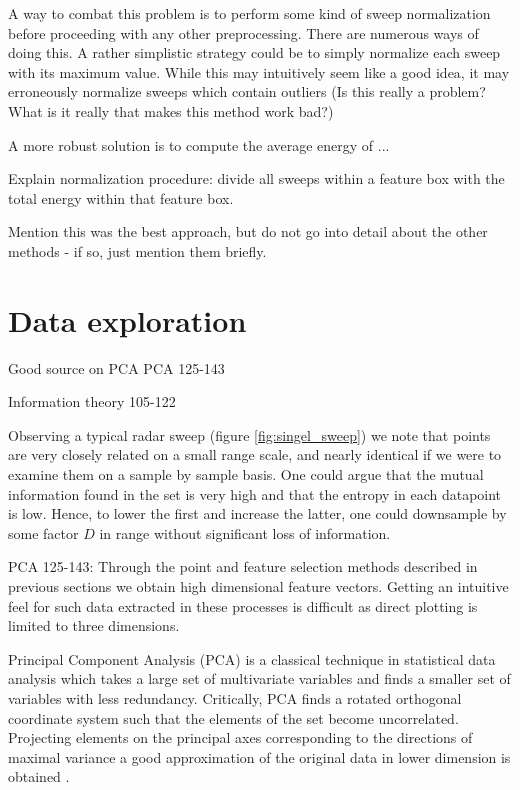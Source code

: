 A way to combat this problem is to perform some kind of sweep normalization before proceeding with any other preprocessing. There are numerous ways of doing this. A rather simplistic strategy could be to simply normalize each sweep with its maximum value. While this may intuitively seem like a good idea, it may erroneously normalize sweeps which contain outliers (Is this really a problem? What is it really that makes this method work bad?)

A more robust solution is to compute the average energy of ...

Explain normalization procedure: divide all sweeps within a feature box with the total energy within that feature box. 

Mention this was the best approach, but do not go into detail about the other methods - if so, just mention them briefly.
\section{Data exploration}


Good source on PCA
\cite{hyvasrinen_karhunen_oja_2004}
PCA 125-143

Information theory
105-122

Observing a typical radar sweep (figure \ref{fig:singel_sweep}) we note that points are very closely related on a small range scale, and nearly identical if we were to examine them on a sample by sample basis. One could argue that the mutual information found in the set is very high and that the entropy in each datapoint is low. Hence, to lower the first and increase the latter, one could downsample by some factor $D$ in range without significant loss of information.


PCA 125-143: Through the point and feature selection methods described in previous sections we obtain high dimensional feature vectors. Getting an intuitive feel for such data extracted in these processes is difficult as direct plotting is limited to three dimensions. 

Principal Component Analysis (PCA) is  a classical technique in statistical data analysis which takes a large set of multivariate variables and finds a smaller set of variables with less redundancy. Critically, PCA finds a rotated orthogonal coordinate system such that the elements of the set become uncorrelated. Projecting elements on the principal axes corresponding to the directions of maximal variance a good approximation of the original data in lower dimension is obtained \citep{hyvasrinen_karhunen_oja_2004}.


